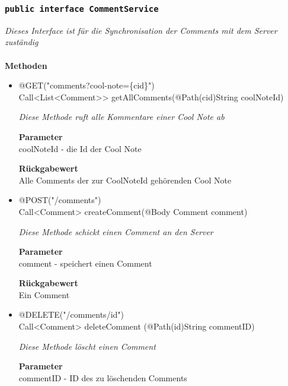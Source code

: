 		\subsubsection{\texttt{public interface CommentService }}
\textit{Dieses Interface ist für die Synchronisation der Comments mit dem Server zuständig}\\
\\
	\textbf{Methoden} \\
		\begin{itemize}
		\item{@GET("comments?cool-note=\{cid\}")\\ Call<List<Comment>> getAllComments(@Path(\grqq cid\grqq)String coolNoteId)}

		\textit{Diese Methode ruft alle Kommentare einer Cool Note ab}

		\textbf{Parameter} \\
	 coolNoteId - die Id der Cool Note 

		\textbf{Rückgabewert} \\
	Alle Comments der zur CoolNoteId gehörenden Cool Note


      \item{@POST("/comments")
\\ Call<Comment> createComment(@Body Comment comment)}

		\textit{Diese Methode schickt einen Comment an den Server }

		\textbf{Parameter} \\
		 comment - speichert einen Comment

		\textbf{Rückgabewert} \\
	Ein Comment

	 \item{@DELETE("/comments/{id}")\\ Call<Comment> deleteComment (@Path(\grqq id\grqq)String commentID)}

		\textit{Diese Methode löscht einen Comment }

		\textbf{Parameter} \\
		 commentID - ID des zu löschenden Comments 
		 

	 \end{itemize}


